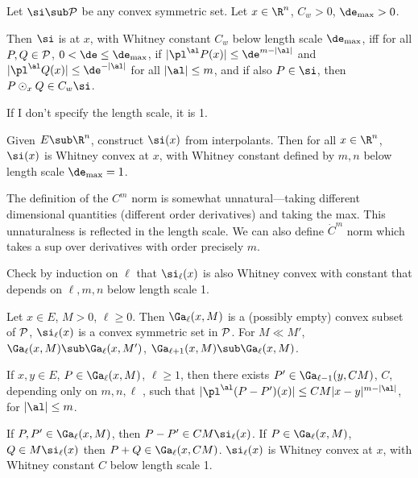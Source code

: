 \begin{df}\label{d:wc}
Let $\si\sub \cal P$ be any convex symmetric set. Let $x\in \R^n$, $C_w>0$, $\de_{\max}>0$. 

Then $\si$ is  at $x$, with Whitney constant $C_w$ below length scale $\de_{\max}$, iff for all $P,Q\in \cal P$, $0<\de\le \de_{\max}$, if $|\pl^\al P(x)|\le \de^{m-|\al|}$ and $|\pl^\al Q(x)| \le \de^{-|\al|}$ for all $|\al|\le m$, and if also $P\in \si$, then $P\odot_x Q \in C_w\si$. 
\end{df}
If I don't specify the length scale, it is 1.
\begin{rem}
Given $E\sub \R^n$, construct $\si(x)$ from interpolants. Then for all $x\in \R^n$, $\si(x)$ is Whitney convex at $x$, with Whitney constant defined by $m,n$ below length scale $\de_{\max}=1$. 
\end{rem}
The definition of the $C^m$ norm is somewhat unnatural---taking different dimensional quantities (different order derivatives) and taking the max. This unnaturalness is reflected in the length scale. We can also define $\dot C^m$ norm which takes a sup over derivatives with order precisely $m$.%

Check by induction on $\ell$ that $\si_{\ell}(x)$ is also Whitney convex with constant that depends on $\ell,m,n$ below length scale 1. 

Let $x\in E$, $M>0$, $\ell\ge 0$. Then $\Ga_\ell(x,M)$ is a (possibly empty) convex subset of $\cal P$, $\si_\ell(x)$ is a convex symmetric set in $\cal P$. For $M\ll M'$, %
$\Ga_\ell(x,M)\sub \Ga_\ell(x,M')$, $\Ga_{\ell+1}(x,M) \sub \Ga_\ell(x,M)$. 

If  $x,y\in E$, $P \in \Ga_\ell(x,M)$, $\ell\ge 1$, then there exists $P'\in \Ga_{\ell-1}(y,CM)$, $C$, depending only on $m,n,\ell$ , such that $|\pl^\al(P-P')(x)|\le CM|x-y|^{m-|\al|}$, for $|\al|\le m$. 

If $P,P'\in \Ga_\ell(x,M)$, then $P-P'\in CM\si_\ell(x)$. If $P\in \Ga_\ell(x,M)$, $Q\in M\si_\ell(x)$ then $P+Q\in \Ga_\ell(x,CM)$.
$\si_\ell(x)$ is Whitney convex at $x$, with Whitney constant $C$ below length scale 1.


